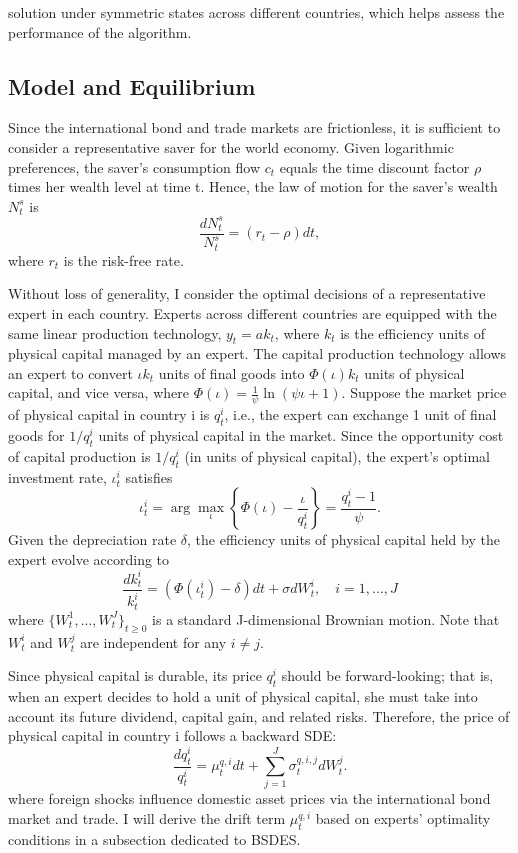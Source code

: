 \documentclass{article}
\begin{document}
\clearpage

solution under symmetric states across different countries, which helps assess the performance of the algorithm.

\subsection{Model and Equilibrium}

Since the international bond and trade markets are frictionless, it is sufficient to consider a representative saver for the world economy. Given logarithmic preferences, the saver's consumption flow $c_{t}$ equals the time discount factor $\rho$ times her wealth level at time t. Hence, the law of motion for the saver's wealth $N_{t}^{s}$ is
\[
\frac{dN_{t}^{s}}{N_{t}^{s}}=(r_{t}-\rho)dt,
\]
where $r_{t}$ is the risk-free rate.

Without loss of generality, I consider the optimal decisions of a representative expert in each country. Experts across different countries are equipped with the same linear production technology, $y_{t}=ak_{t}$, where $k_{t}$ is the efficiency units of physical capital managed by an expert. The capital production technology allows an expert to convert $\iota k_{t}$ units of final goods into $\Phi(\iota)k_{t}$ units of physical capital, and vice versa, where $\Phi(\iota)=\frac{1}{\psi}\ln(\psi\iota+1)$. Suppose the market price of physical capital in country i is $q_{t}^{i}$, i.e., the expert can exchange 1 unit of final goods for $1/q_{t}^{i}$ units of physical capital in the market. Since the opportunity cost of capital production is $1/q_{t}^{i}$ (in units of physical capital), the expert's optimal investment rate, $\iota_{t}^{i}$ satisfies
\[
\iota_{t}^{i}=\arg\max_{\iota}\left\{\Phi(\iota)-\frac{\iota}{q_{t}^{i}}\right\}=\frac{q_{t}^{i}-1}{\psi}.
\]
Given the depreciation rate $\delta$, the efficiency units of physical capital held by the expert evolve according to
\[
\frac{dk_{t}^{i}}{k_{t}^{i}}=(\Phi(\iota_{t}^{i})-\delta)dt+\sigma dW_{t}^{i}, \quad i=1,...,J
\]
where $\{W_{t}^{1},...,W_{t}^{J}\}_{t\ge0}$ is a standard J-dimensional Brownian motion. Note that $W_{t}^{i}$ and $W_{t}^{j}$ are independent for any $i\ne j$.

Since physical capital is durable, its price $q_{t}^{i}$ should be forward-looking; that is, when an expert decides to hold a unit of physical capital, she must take into account its future dividend, capital gain, and related risks. Therefore, the price of physical capital in country i follows a backward SDE:
\[
\frac{dq_{t}^{i}}{q_{t}^{i}}=\mu_{t}^{q,i}dt+\sum_{j=1}^{J}\sigma_{t}^{q,i,j}dW_{t}^{j}.
\]
where foreign shocks influence domestic asset prices via the international bond market and trade. I will derive the drift term $\mu_{t}^{q,i}$ based on experts' optimality conditions in a subsection dedicated to BSDES.
\end{document}
